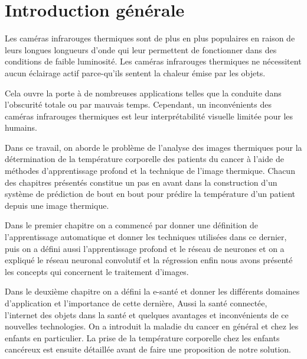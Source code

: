 \documentclass[12pt]{article}
\begin{document}
\listoffigures
{}
\cleardoublepage

\listoftables
{}
\cleardoublepage

\setcounter{page}{1}

\section{Introduction générale}
Les caméras infrarouges thermiques sont de plus en plus populaires en raison de leurs longues longueurs d’onde qui leur permettent de fonctionner dans des conditions de faible luminosité. Les caméras infrarouges thermiques ne nécessitent aucun éclairage actif parce-qu’ils sentent la chaleur émise par les objets.

Cela ouvre la porte à de nombreuses applications telles que la conduite dans l'obscurité totale ou par mauvais temps. Cependant, un inconvénients des caméras infrarouges thermiques est leur interprétabilité visuelle limitée pour les humains.

Dans ce travail, on aborde le problème de l’analyse des images thermiques pour la détermination de la température corporelle des patients du cancer à l’aide de méthodes d’apprentissage profond et la technique de l’image thermique. Chacun des chapitres présentés constitue un pas en avant dans la construction d'un système de prédiction de bout en bout pour prédire la température d’un patient depuis une image thermique.

Dans le premier chapitre on a commencé par donner une définition de l’apprentissage automatique et donner les techniques utilisées dans ce dernier, puis on a défini aussi l’apprentissage profond et le réseau de neurones et on a expliqué le réseau neuronal convolutif et la régression enfin nous avons présenté les concepts qui concernent le traitement d’images.

Dans le deuxième chapitre on a défini la e-santé et donner les différents domaines d'application et l’importance de cette dernière, Aussi la santé connectée, l’internet des objets dans la santé et quelques avantages et inconvénients de ce nouvelles technologies. On a introduit la maladie du cancer en général et chez les enfants en particulier. La prise de la température corporelle chez les enfants cancéreux est ensuite détaillée avant de faire une proposition de notre solution.
\end{document}
